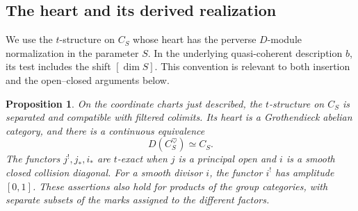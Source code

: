 \documentclass[11pt]{article}
\numberwithin{equation}{section}
\newtheorem{proposition}[theorem]{Proposition}
\theoremstyle{definition}
\theoremstyle{remark}
\begin{document}
\subsection{The heart and its derived realization}

We use the $t$-structure on $C_S$ whose heart has the perverse
$D$-module normalization in the parameter $S$.  In the underlying
quasi-coherent description $b$, its test includes the shift $[\dim S]$.
This convention is relevant to both insertion and the open--closed
arguments below.

\begin{proposition}\label{local:heart}
On the coordinate charts just described, the $t$-structure on $C_S$ is
separated and compatible with filtered colimits.  Its heart is a
Grothendieck abelian category, and there is a continuous equivalence
\begin{equation}\label{eq:L8}
                     D(C_S^\heartsuit)\simeq C_S.
\end{equation}
The functors $j^!,j_*,i_*$ are $t$-exact when $j$ is a principal open and
$i$ is a smooth closed collision diagonal.  For a smooth divisor
$i$, the functor $i^!$ has amplitude $[0,1]$.  These assertions also hold
for products of the group categories, with separate subsets of the
marks assigned to the different factors.
\end{proposition}
\end{document}
